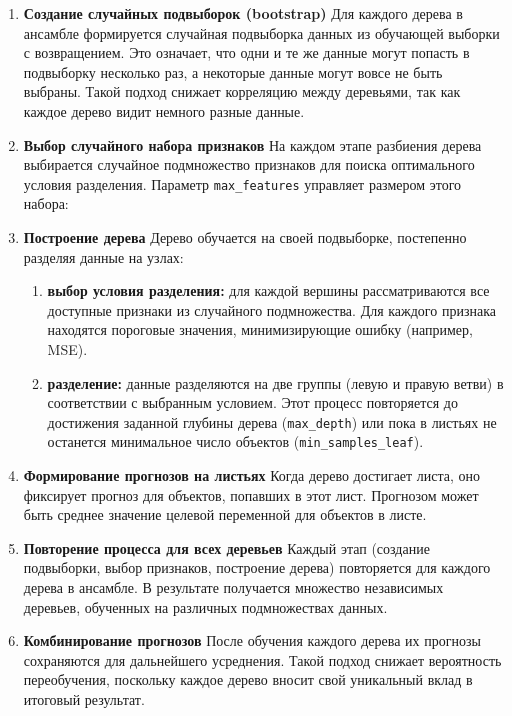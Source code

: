{\begin{enumerate}
    \item \textbf{Создание случайных подвыборок (bootstrap)}  
    Для каждого дерева в ансамбле формируется случайная подвыборка данных из обучающей выборки с возвращением. Это означает, что одни и те же данные могут попасть в подвыборку несколько раз, а некоторые данные могут вовсе не быть выбраны.  
    Такой подход снижает корреляцию между деревьями, так как каждое дерево видит немного разные данные.  

    \item \textbf{Выбор случайного набора признаков}  
    На каждом этапе разбиения дерева выбирается случайное подмножество признаков для поиска оптимального условия разделения. Параметр \texttt{max\_features} управляет размером этого набора:  

    \item \textbf{Построение дерева}  
    Дерево обучается на своей подвыборке, постепенно разделяя данные на узлах:  
    \begin{enumerate}
        \item \textbf{выбор условия разделения:} для каждой вершины рассматриваются все доступные признаки из случайного подмножества. Для каждого признака находятся пороговые значения, минимизирующие ошибку (например, MSE).  
        \item \textbf{разделение:} данные разделяются на две группы (левую и правую ветви) в соответствии с выбранным условием. Этот процесс повторяется до достижения заданной глубины дерева (\texttt{max\_depth}) или пока в листьях не останется минимальное число объектов (\texttt{min\_samples\_leaf}).  
    \end{enumerate}

    \item \textbf{Формирование прогнозов на листьях}  
    Когда дерево достигает листа, оно фиксирует прогноз для объектов, попавших в этот лист. Прогнозом может быть среднее значение целевой переменной для объектов в листе.  

    \item \textbf{Повторение процесса для всех деревьев}  
    Каждый этап (создание подвыборки, выбор признаков, построение дерева) повторяется для каждого дерева в ансамбле. В результате получается множество независимых деревьев, обученных на различных подмножествах данных.  

    \item \textbf{Комбинирование прогнозов}  
    После обучения каждого дерева их прогнозы сохраняются для дальнейшего усреднения. Такой подход снижает вероятность переобучения, поскольку каждое дерево вносит свой уникальный вклад в итоговый результат.  
\end{enumerate}
\newpage
}
